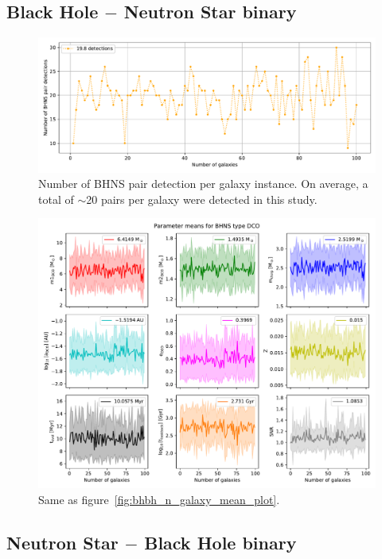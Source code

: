 \subsection{Black Hole $-$ Neutron Star binary}
\begin{figure}[!h]
	\centering
    \includegraphics[width=\columnwidth]{analysis_data/004__images_for_latex/BHNS_n_detections}
	\caption{Number of BHNS pair detection per galaxy instance. On average, a total of $\sim$20 pairs per galaxy were detected in this study.}
	\label{fig:bhnsndetections}
\end{figure}	

\begin{figure}[!h]
	\centering
    \includegraphics[width=\columnwidth]{analysis_data/004__images_for_latex/BHNS_n_galaxy_mean_plot}
	\caption{Same as figure~\ref{fig:bhbh_n_galaxy_mean_plot}.}
	\label{fig:bhns_n_galaxy_mean_plot}
\end{figure}

\newpage
\subsection{Neutron Star $-$ Black Hole binary}

